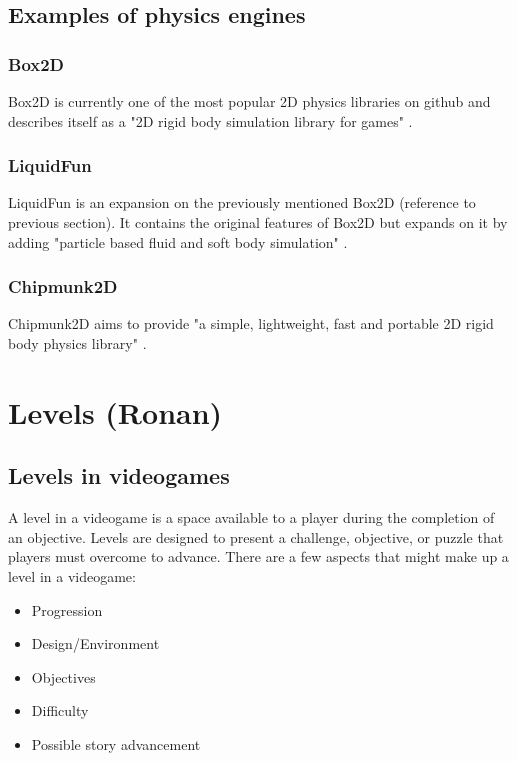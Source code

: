 \documentclass{article} %
\begin{document}
\subsection{Examples of physics engines}

\subsubsection{Box2D}

Box2D is currently one of the most popular 2D physics libraries on github and describes itself as a "2D rigid body simulation library for games" \cite{Catto_2024}.

\subsubsection{LiquidFun}

LiquidFun is an expansion on the previously mentioned Box2D (reference to previous section). It contains the original features of Box2D but expands on it by adding "particle based fluid and soft body simulation" \cite{Miles_2014}.

\subsubsection{Chipmunk2D}

Chipmunk2D aims to provide "a simple, lightweight, fast and portable 2D rigid body physics library" \cite{Slembcke_2023}.

\newpage

\section{Levels (Ronan)}
\subsection{Levels in videogames}
A level in a videogame is a space available to a player during 
the completion of an objective. Levels are designed to present a challenge, 
objective, or puzzle that players must overcome to advance. 
There are a few aspects that might make up a level in a videogame:
\begin{itemize}
	\item Progression
	\item Design/Environment
	\item Objectives
	\item Difficulty
	\item Possible story advancement
\end{itemize}
\end{document}
